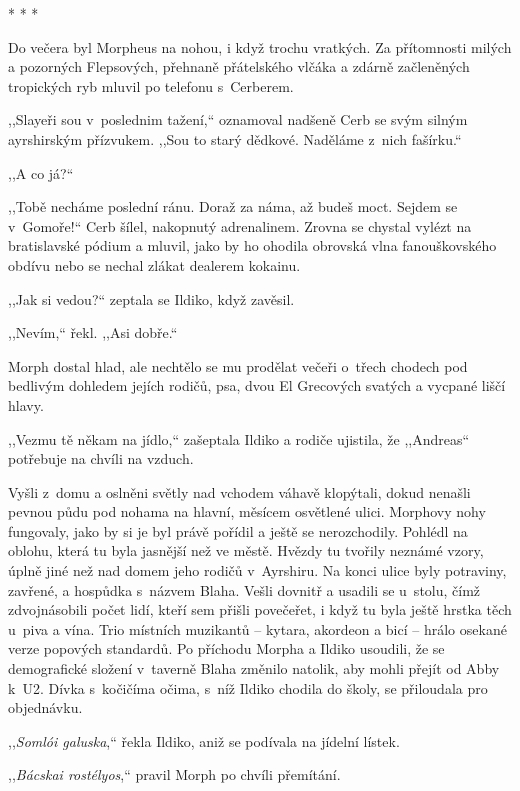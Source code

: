 \begin{center}
* * *
\end{center}

Do večera byl Morpheus na nohou, i když trochu vratkých. Za přítomnosti milých a pozorných Flepsových, přehnaně přátelského vlčáka a zdárně začleněných tropických ryb mluvil po telefonu s Cerberem.

,,Slayeři sou v poslednim tažení,`` oznamoval nadšeně Cerb se svým silným ayrshirským přízvukem. ,,Sou to starý dědkové. Naděláme z nich fašírku.``

,,A co já?``

,,Tobě necháme poslední ránu. Doraž za náma, až budeš moct. Sejdem se v Gomoře!`` Cerb šílel, nakopnutý adrenalinem. Zrovna se chystal vylézt na bratislavské pódium a mluvil, jako by ho ohodila obrovská vlna fanouškovského obdívu nebo se nechal zlákat dealerem kokainu.

,,Jak si vedou?`` zeptala se Ildiko, když zavěsil.

,,Nevím,`` řekl. ,,Asi dobře.``

Morph dostal hlad, ale nechtělo se mu prodělat večeři o~třech chodech pod bedlivým dohledem jejích rodičů, psa, dvou El Grecových svatých a vycpané liščí hlavy.

,,Vezmu tě někam na jídlo,`` zašeptala Ildiko a rodiče ujistila, že ,,Andreas`` potřebuje na chvíli na vzduch.

Vyšli z domu a oslněni světly nad vchodem váhavě klopýtali, dokud nenašli pevnou půdu pod nohama na hlavní, měsícem osvětlené ulici. Morphovy nohy fungovaly, jako by si je byl právě pořídil a ještě se nerozchodily. Pohlédl na oblohu, která tu byla jasnější než ve městě. Hvězdy tu tvořily neznámé vzory, úplně jiné než nad domem jeho rodičů v Ayrshiru.
Na konci ulice byly potraviny, zavřené, a hospůdka s názvem Blaha. Vešli dovnitř a usadili se u~stolu, čímž zdvojnásobili počet lidí, kteří sem přišli povečeřet, i když tu byla ještě hrstka těch u~piva a vína. Trio místních muzikantů -- kytara, akordeon a bicí -- hrálo osekané verze popových standardů. Po příchodu Morpha a Ildiko usoudili, že se demografické složení v taverně Blaha změnilo natolik, aby mohli přejít od Abby k U2. Dívka s kočičíma očima, s níž Ildiko chodila do školy, se přiloudala pro objednávku.

,,\textit{Somlói galuska},`` řekla Ildiko, aniž se podívala na jídelní lístek.

,,\textit{Bácskai rostélyos},`` pravil Morph po chvíli přemítání.

